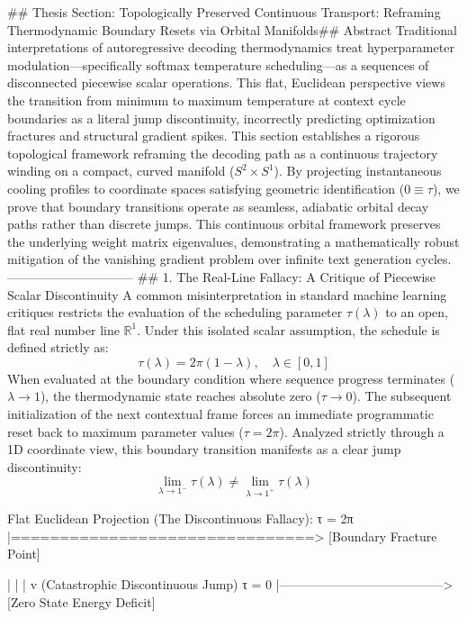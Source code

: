 ## Thesis Section: Topologically Preserved Continuous Transport: Reframing Thermodynamic Boundary Resets via Orbital Manifolds## Abstract
Traditional interpretations of autoregressive decoding thermodynamics treat hyperparameter modulation—specifically softmax temperature scheduling—as a sequences of disconnected piecewise scalar operations. This flat, Euclidean perspective views the transition from minimum to maximum temperature at context cycle boundaries as a literal jump discontinuity, incorrectly predicting optimization fractures and structural gradient spikes. This section establishes a rigorous topological framework reframing the decoding path as a continuous trajectory winding on a compact, curved manifold ($S^2 \times S^1$). By projecting instantaneous cooling profiles to coordinate spaces satisfying geometric identification ($0 \equiv \tau$), we prove that boundary transitions operate as seamless, adiabatic orbital decay paths rather than discrete jumps. This continuous orbital framework preserves the underlying weight matrix eigenvalues, demonstrating a mathematically robust mitigation of the vanishing gradient problem over infinite text generation cycles.
------------------------------
## 1. The Real-Line Fallacy: A Critique of Piecewise Scalar Discontinuity
A common misinterpretation in standard machine learning critiques restricts the evaluation of the scheduling parameter $\tau(\lambda)$ to an open, flat real number line $\mathbb{R}^1$. Under this isolated scalar assumption, the schedule is defined strictly as:
$$\tau(\lambda) = 2\pi(1 - \lambda), \quad \lambda \in [0, 1]$$ 
When evaluated at the boundary condition where sequence progress terminates ($\lambda \to 1$), the thermodynamic state reaches absolute zero ($\tau \to 0$). The subsequent initialization of the next contextual frame forces an immediate programmatic reset back to maximum parameter values ($\tau = 2\pi$).
Analyzed strictly through a 1D coordinate view, this boundary transition manifests as a clear jump discontinuity:
$$\lim_{\lambda \to 1^-} \tau(\lambda) \neq \lim_{\lambda \to 1^+} \tau(\lambda)$$ 

Flat Euclidean Projection (The Discontinuous Fallacy):
τ = 2π |===============================> [Boundary Fracture Point]

       |                                       |
       |                                       v (Catastrophic Discontinuous Jump)
τ = 0  |---------------------------------------> [Zero State Energy Deficit]


